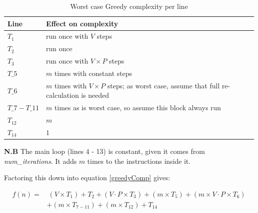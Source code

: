 \documentclass[12pt]{report}
\begin{document}
\begin{table}[H]
\centering
\caption{Worst case Greedy complexity per line}
\label{greedyLines}
\begin{tabular}{@{}|l|l|@{}}
\toprule
Line               & Effect on complexity                                                                        \\ \midrule
$T_1$              & run once with $V$ steps                                                                     \\ \midrule
$T_2$              & run once                                                                                    \\ \midrule
$T_3$              & run once with $V \times P$ steps                                                            \\ \midrule
$T\_5$             & $m$ times with constant steps                                                               \\ \midrule
$T\_6$             & $m$ times with $V \times P$ steps; as worst case, assume that full re-calculation is needed \\ \midrule
$T\_7 - T\_{11}$ & $m$ times as is worst case, so assume this block always run                                 \\ \midrule
$T_{12}$           & $m$                                                                                         \\ \midrule
$T_{14}$           & $1$                                                                                         \\ \bottomrule
\end{tabular}
\end{table}

\textbf{N.B} The main loop (lines 4 - 13) is constant, given it comes from \textit{num\_iterations}. It adds $m$ times to the instructions inside it.

Factoring this down into equation \ref{greedyComp} gives: 

\begin{equation}\label{greedyComp}
\begin{aligned}
	f(n) ={} & \ (V \times T_1) + T_2 + (V \cdot P \times T_3) + (m \times T_5) + (m \times V \cdot P \times T_6) \\
	 	& + (m \times T_{7 - 11}) + (m \times T_{12}) + T_{14}
\end{aligned}
\end{equation}
\end{document}
